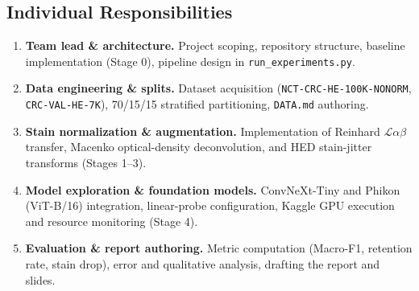 \documentclass[11pt,a4paper]{article}
\begin{document}
\subsection*{Individual Responsibilities}
\begin{enumerate}
  \item \textbf{Team lead \& architecture.} Project scoping, repository structure,
        baseline implementation (Stage 0), pipeline design in
        \texttt{run\_experiments.py}.
  \item \textbf{Data engineering \& splits.} Dataset acquisition
        (\texttt{NCT-CRC-HE-100K-NONORM}, \texttt{CRC-VAL-HE-7K}), 70/15/15 stratified
        partitioning, \texttt{DATA.md} authoring.
  \item \textbf{Stain normalization \& augmentation.} Implementation of Reinhard
        $\mathcal{L}\alpha\beta$ transfer, Macenko optical-density deconvolution, and
        HED stain-jitter transforms (Stages 1--3).
  \item \textbf{Model exploration \& foundation models.} ConvNeXt-Tiny and Phikon
        (ViT-B/16) integration, linear-probe configuration, Kaggle GPU execution and
        resource monitoring (Stage 4).
  \item \textbf{Evaluation \& report authoring.} Metric computation (Macro-F1,
        retention rate, stain drop), error and qualitative analysis, drafting the
        report and slides.
\end{enumerate}
\end{document}
